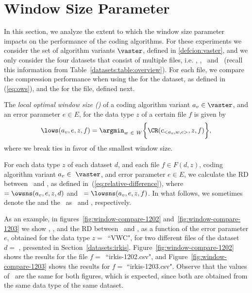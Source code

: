 
\clearpage
\section{Window Size Parameter}
\label{secX:windows}


In this section, we analyze the extent to which the window size parameter impacts on the performance of the coding algorithms. For these experiments we consider the set of algorithm variants $\vaster$, defined in \ref{defcion:vaster}, and we only consider the four datasets that consist of multiple files, i.e. \datasetirkis, \datasetsst, \datasetadcp \ and \datasetsolar\ (recall this information from Table~\ref{datasets:table:overview}). For each file, we compare the compression performance when using the \ows for the dataset, as defined in (\ref{eq:ows}), and the \lows for the file, defined next.


\begin{defcion}
The \textit{local optimal window size (\lowsit)} of a coding algorithm variant $a_v \in \vaster$, and an error parameter $e \in E$, for the data type $z$ of a certain file $f$ is given by
\begin{equation}
\lows(a_v, e, z, f) = \argmin_{w\ \in \ W} \biggl\{ \CR(c_{<a_v, w, e>}, z, f) \biggr\},
\end{equation}
where we break ties in favor of the smallest window size.
\end{defcion}


For each data type $z$ of each dataset $d$, and each file $f \in F(d, z)$, coding algorithm variant $a_v \in~\vaster$, and error parameter $e \in E$, we calculate the RD between \globalCAI\ and \localCAI, as defined in~(\ref{eq:relative-difference}), where \WGlobal\ $=\owsns(a_v, e, z, d)$ and \WLocal\ $=\lowsns(a_v, e, z, f)$. In what follows, we sometimes denote the \ows and the \lows\ as \WGlobal\ and \WLocal, respectively.


\newcommand{\fileIrkisOne}{irkis-1202.csv}
\newcommand{\fileIrkisTwo}{irkis-1203.csv}


As an example, in figures~\ref{fig:window-compare-1202} and~\ref{fig:window-compare-1203} we show \WGlobal, \WLocal, and the RD between \globalCAI\ and \localCAI, as a function of the error parameter $e$, obtained for the data type $z=$~``VWC", for two different files of the dataset $d=$ \datasetirkis, presented in Section~\ref{datasets:irkis}. Figure~\ref{fig:window-compare-1202} shows the results for the file $f=$~``\fileIrkisOne", and Figure~\ref{fig:window-compare-1203} shows the results for $f=$ ``\fileIrkisTwo". Observe that the values of \WGlobal\ are the same for both figures, which is expected, since both are obtained from the same data type of the same dataset.



